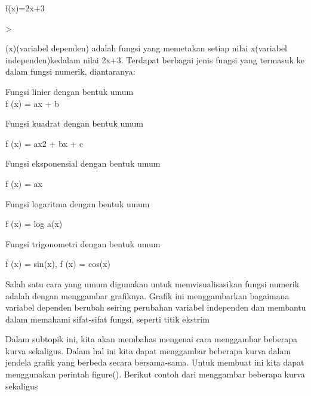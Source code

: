 \documentclass[a4paper,10pt]{article}
\begin{document}
\begin{eulernotebook}
\begin{eulercomment}
\begin{eulercomment}
\begin{eulercomment}
\begin{eulercomment}
\begin{eulercomment}
\begin{eulercomment}
\begin{eulercomment}
f(x)=2x+3
\end{eulercomment}
\begin{eulerprompt}
> 
\end{eulerprompt}
\begin{eulercomment}
(x)(variabel dependen) adalah fungsi yang memetakan setiap nilai
x(variabel independen)kedalam nilai 2x+3. Terdapat berbagai jenis
fungsi yang termasuk ke dalam fungsi numerik, diantaranya:

Fungsi linier dengan bentuk umum\\
f (x) = ax + b
\end{eulercomment}
\begin{eulercomment}
Fungsi kuadrat dengan bentuk umum

f (x) = ax2 + bx + c
\end{eulercomment}
\begin{eulercomment}
Fungsi eksponensial dengan bentuk umum

f (x) = ax
\end{eulercomment}
\begin{eulercomment}
Fungsi logaritma dengan bentuk umum

f (x) = log a(x)

\end{eulercomment}
\begin{eulercomment}
Fungsi trigonometri dengan bentuk umum

f (x) = sin(x), f (x) = cos(x)

\end{eulercomment}
\begin{eulercomment}
Salah satu  cara  yang  umum  digunakan  untuk  memvisualisasikan
fungsi numerik adalah dengan menggambar grafiknya. Grafik ini
menggambarkan bagaimana variabel dependen berubah seiring perubahan
variabel independen dan membantu dalam memahami sifat-sifat fungsi,
seperti titik ekstrim
\end{eulercomment}
\begin{eulercomment}
Dalam subtopik ini, kita akan membahas mengenai cara menggambar
beberapa kurva sekaligus. Dalam hal ini kita dapat menggambar beberapa
kurva dalam jendela grafik yang berbeda secara bersama-sama. Untuk
membuat ini kita dapat menggunakan perintah figure(). Berikut contoh
dari menggambar beberapa kurva sekaligus


\end{eulercomment}
\end{eulercomment}
\end{eulercomment}
\end{eulercomment}
\end{eulercomment}
\end{eulercomment}
\end{eulercomment}
\end{eulernotebook}
\end{document}
